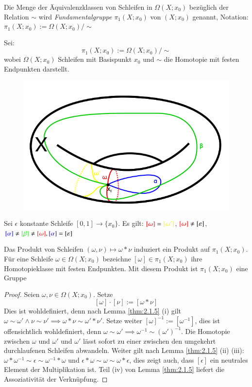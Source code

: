 \documentclass[a4paper,10pt]{scrartcl}
\begin{document}
\begin{df}
 Die Menge der Äquivalenzklassen von Schleifen in $\Omega(X;x_0)$ bezüglich der Relation $\sim$ wird \emph{Fundamentalgruppe} $\pi_1(X; x_0)$ von $(X;x_0)$ genannt, Notation: $\pi_1(X;x_0):= \Omega(X;x_0)/\sim$
\end{df}
Sei:
\[
 \pi_1(X;x_0):= \Omega(X;x_0)/\sim 
\]
wobei $\Omega(X;x_0)$ Schleifen mit Basispunkt $x_0$ und $\sim$ die Homotopie mit festen Endpunkten darstellt.\\
\setcounter{figure}{55} %
\begin{figure}[H]
\centering
\includegraphics[scale=0.3]{fig56.png}
\caption{}
\end{figure}
Sei $\epsilon$ konstante Schleife $[0,1]\to \{x_0\}$.
Es gilt: $\textcolor {red} {[\omega]}=\textcolor {yellow} {[\omega']}$, $\textcolor {red} {[\omega]}\neq [\epsilon]$, $\textcolor {blue} {[\alpha]}\neq \textcolor {green} {[\beta]}\neq \textcolor {red} {[\omega]}, \textcolor {blue} {[\alpha]}=[\epsilon]$
\begin{st}
 Das Produkt von Schleifen $(\omega, \nu) \mapsto \omega * \nu$ induziert ein Produkt auf $\pi_1(X;x_0)$. Für 
eine Schleife $\omega \in \Omega(X;x_0)$ bezeichne $[\omega] \in \pi_1(X; x_0)$ ihre Homotopieklasse mit festen Endpunkten. Mit diesem Produkt ist $\pi_1(X;x_0)$ eine Gruppe
\end{st}
\begin{proof}
 Seien $\omega, \nu \in \Omega(X; x_0)$. Setze 
\[
 [\omega] \cdot [\nu]:=[\omega*\nu]
\]
Dies ist wohldefiniert, denn nach Lemma \ref{thm:2.1.5} (i) gilt $\omega \sim \omega' \land \nu \sim \nu' \implies \omega * \nu \sim \omega' * \nu'$. Setze weiter $[\omega]^{-1}:=[\omega^{-1}]$, dies ist offensichtlich wohldefiniert, denn $\omega \sim \omega' \implies \omega^{-1}\sim (\omega')^{-1}$. Die Homotopie zwischen $\omega$ und $\omega'$ und $\omega'$ lässt sofort zu einer zwischen den umgekehrt durchlaufenen Schleifen abwandeln. Weiter gilt nach Lemma \ref{thm:2.1.5} (ii) (iii): $\omega*\omega^{-1}\sim \epsilon \sim \omega^{-1}*\omega$ und $\epsilon*\omega\sim \omega \sim \omega*\epsilon$, dies zeigt auch, dass $[\epsilon]$ ein neutrales Element der Multiplikation ist. Teil (iv) von Lemma \ref{thm:2.1.5} liefert die Assoziativität der Verknüpfung. 
\end{proof}
\end{document}
